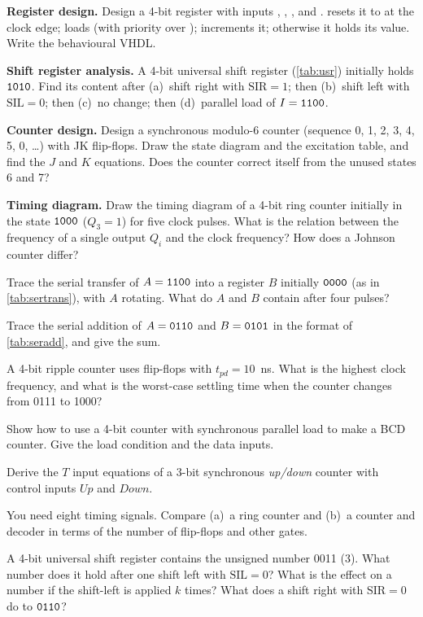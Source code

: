 \begin{exlist}
  \item \textbf{Register design.} Design a 4-bit register with inputs , , ,  and .  resets it to  at the clock edge;  loads  (with priority over );  increments it; otherwise it holds its value. Write the behavioural VHDL.
  \item \textbf{Shift register analysis.} A 4-bit universal shift register (\cref{tab:usr}) initially holds $\mathtt{1010}$. Find its content after (a)~shift right with $\mathrm{SIR}=1$; then (b)~shift left with $\mathrm{SIL}=0$; then (c)~no change; then (d)~parallel load of $I=\mathtt{1100}$.
  \item \textbf{Counter design.} Design a synchronous modulo-6 counter (sequence 0, 1, 2, 3, 4, 5, 0, \dots) with JK flip-flops. Draw the state diagram and the excitation table, and find the $J$ and $K$ equations. Does the counter correct itself from the unused states 6 and 7?
  \item \textbf{Timing diagram.} Draw the timing diagram of a 4-bit ring counter initially in the state $\mathtt{1000}$ ($Q_3=1$) for five clock pulses. What is the relation between the frequency of a single output $Q_i$ and the clock frequency? How does a Johnson counter differ?
  \item Trace the serial transfer of $A=\mathtt{1100}$ into a register $B$ initially $\mathtt{0000}$ (as in \cref{tab:sertrans}), with $A$ rotating. What do $A$ and $B$ contain after four pulses?
  \item Trace the serial addition of $A=\mathtt{0110}$ and $B=\mathtt{0101}$ in the format of \cref{tab:seradd}, and give the sum.
  \item A 4-bit ripple counter uses flip-flops with $t_{pd}=10$~ns. What is the highest clock frequency, and what is the worst-case settling time when the counter changes from 0111 to 1000?
  \item Show how to use a 4-bit counter with synchronous parallel load to make a BCD counter. Give the load condition and the data inputs.
  \item Derive the $T$ input equations of a 3-bit synchronous \emph{up/down} counter with control inputs $\mathit{Up}$ and $\mathit{Down}$.
  \item You need eight timing signals. Compare (a)~a ring counter and (b)~a counter and decoder in terms of the number of flip-flops and other gates.
  \item A 4-bit universal shift register contains the unsigned number 0011 (3). What number does it hold after one shift left with $\mathrm{SIL}=0$? What is the effect on a number if the shift-left is applied $k$ times? What does a shift right with $\mathrm{SIR}=0$ do to $\mathtt{0110}$?

\end{exlist}
